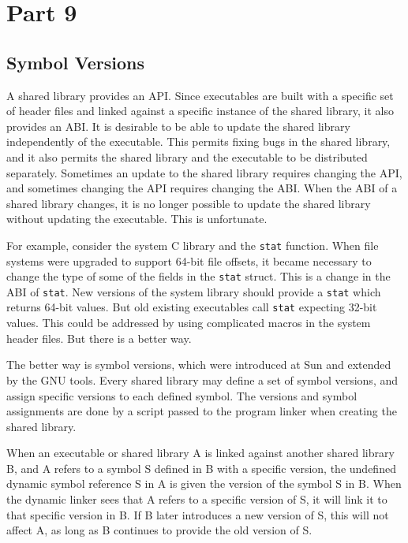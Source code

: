 \section{Part 9}

\subsection{Symbol Versions}

A shared library provides an API. Since executables are built with a specific
set of header files and linked against a specific instance of the shared
library, it also provides an ABI. It is desirable to be able to update the
shared library independently of the executable. This permits fixing bugs in the
shared library, and it also permits the shared library and the executable to
be distributed separately. Sometimes an update to the shared library requires
changing the API, and sometimes changing the API requires changing the ABI.
When the ABI of a shared library changes, it is no longer possible to update
the shared library without updating the executable. This is unfortunate.

For example, consider the system C library and the \texttt{stat} function. When
file systems were upgraded to support 64-bit file offsets, it became necessary
to change the type of some of the fields in the \texttt{stat} struct. This
is a change in the ABI of \texttt{stat}. New versions of the system library
should provide a \texttt{stat} which returns 64-bit values. But old existing
executables call \texttt{stat} expecting 32-bit values. This could be addressed
by using complicated macros in the system header files. But there is a better
way.

The better way is symbol versions, which were introduced at Sun and extended
by the GNU tools. Every shared library may define a set of symbol versions,
and assign specific versions to each defined symbol. The versions and symbol
assignments are done by a script passed to the program linker when creating the
shared library.

When an executable or shared library A is linked against another shared library
B, and A refers to a symbol S defined in B with a specific version, the
undefined dynamic symbol reference S in A is given the version of the symbol S
in B. When the dynamic linker sees that A refers to a specific version of S, it
will link it to that specific version in B. If B later introduces a new version
of S, this will not affect A, as long as B continues to provide the old version
of S.

